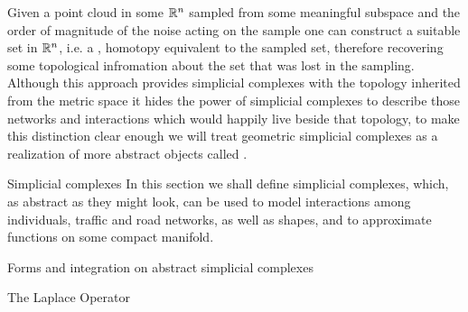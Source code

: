 \documentclass[../main.tex]{subfiles}
\begin{document}
     
    Given a point cloud in some $\mathbb{R}^n$ sampled from some meaningful subspace and the order of magnitude of the noise acting on the sample one can 
    construct a suitable set in $\mathbb{R}^n$, i.e. a , homotopy equivalent to the sampled set, therefore recovering some
    topological infromation about the set that was lost in the sampling. 
    Although this approach provides simplicial complexes with the topology inherited from the metric space it hides the power of simplicial complexes 
    to describe those networks and interactions which would happily live beside that topology, to make this distinction clear enough we will treat geometric 
    simplicial complexes as a realization of more abstract objects called .

    \begin{section}{Simplicial complexes}
        {\color{red} In this section we shall define simplicial complexes, which, as abstract as they might look, can 
        be used to model interactions among individuals, traffic and road networks, as well as shapes, and 
        to approximate functions on some compact manifold.}
            
    \end{section}
    \begin{section}{Forms and integration on abstract simplicial complexes}
            
    \end{section}
    \begin{section}{The Laplace Operator}
    \end{section}
\end{document}
